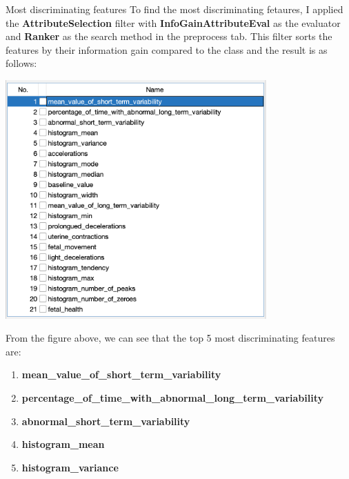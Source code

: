 \documentclass[12pt]{article}
\begin{document}
\begin{section}{Most discriminating features}
 To find the most discriminating fetaures, I applied the \textbf{AttributeSelection} filter with \textbf{InfoGainAttributeEval}
 as the evaluator and \textbf{Ranker} as the search method in the preprocess tab. This filter sorts the features by their information
 gain compared to the class and the result is as follows:

 \begin{center}
     \includegraphics[width=10cm]{images/4_1_finding_most_discriminating_features.png}
 \end{center}

 From the figure above, we can see that the top 5 most discriminating features are:
 \begin{enumerate}
     \item \textbf{mean\_value\_of\_short\_term\_variability}
     \item \textbf{percentage\_of\_time\_with\_abnormal\_long\_term\_variability}
     \item \textbf{abnormal\_short\_term\_variability}
     \item \textbf{histogram\_mean}
     \item \textbf{histogram\_variance}
 \end{enumerate}

\end{section}
\end{document}
